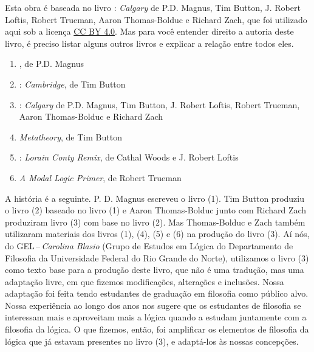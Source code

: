 \newpage

\noindent Esta obra é baseada no livro \forallx: \textit{Calgary} de P.D. Magnus, Tim Button, J. Robert Loftis, Robert Trueman, Aaron Thomas-Bolduc e Richard Zach, que foi utilizado aqui sob a licença \href{https://creativecommons.org/licenses/by/4.0/}{CC BY 4.0}.
Mas para você entender direito a autoria deste livro, é preciso listar alguns outros livros e explicar a relação entre todos eles.

\begin{enumerate}
   \item \forallx, de P.D. Magnus

   \item \forallx: \textit{Cambridge}, de Tim Button

   \item \forallx: \textit{Calgary} de P.D. Magnus, Tim Button, J. Robert Loftis, Robert Trueman, Aaron Thomas-Bolduc e Richard Zach
   
   \item \textit{Metatheory}, de Tim Button
   
   \item  \forallx: \textit{Lorain Conty Remix}, de Cathal Woods e J. Robert Loftis
   
   \item \textit{A Modal Logic Primer}, de Robert Trueman
\end{enumerate}

\noindent A história é a seguinte.
P. D. Magnus escreveu o livro (1). Tim Button produziu o livro (2) baseado no livro (1) e Aaron Thomas-Bolduc junto com Richard Zach produziram  livro (3) com base no livro (2).
Mas Thomas-Bolduc e Zach também utilizaram materiais dos livros (1), (4), (5) e (6) na produção do livro (3).
Aí nós, do GEL\,--\,\textit{Carolina Blasio} (Grupo de Estudos em Lógica do Departamento de Filosofia da Universidade Federal do Rio Grande do Norte), 
utilizamos o livro (3) como texto base para a produção deste livro, que não é uma tradução, mas uma adaptação livre, em que fizemos modificações, alterações e inclusões.
Nossa adaptação foi feita tendo estudantes de graduação em filosofia como público alvo.
Nossa experiência ao longo dos anos nos sugere que  os estudantes de filosofia se interessam mais e aproveitam mais a lógica quando a estudam juntamente com a filosofia da lógica.
O que fizemos, então, foi amplificar os elementos de filosofia da lógica que já estavam presentes no livro (3), e adaptá-los às nossas concepções.

